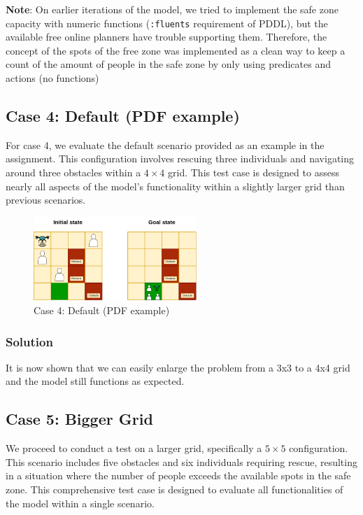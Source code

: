 \documentclass{article}
\begin{document}
\textbf{Note}: On earlier iterations of the model, we tried to implement the safe zone capacity with numeric functions (\texttt{:fluents} requirement of PDDL), but the available free online planners have trouble supporting them. Therefore, the concept of the spots of the free zone was implemented as a clean way to keep a count of the amount of people in the safe zone by only using predicates and actions (no functions)

\subsection{Case 4: Default (PDF example)}

For case 4, we evaluate the default scenario provided as an example in the assignment. This configuration involves rescuing three individuals and navigating around three obstacles within a \(4 \times 4\) grid. This test case is designed to assess nearly all aspects of the model's functionality within a slightly larger grid than previous scenarios.

\begin{figure}[ht]
    \centering
    \includegraphics[width=0.55\textwidth]{assets/problem-4-pdf-example.drawio.png}
    \caption{Case 4: Default (PDF example)}
    \label{fig:initial-state-default}
\end{figure}

\subsubsection{Solution}
It is now shown that we can easily enlarge the problem from a 3x3 to a 4x4 grid and the model still functions as expected.

\subsection{Case 5: Bigger Grid}

We proceed to conduct a test on a larger grid, specifically a \(5 \times 5\) configuration. This scenario includes five obstacles and six individuals requiring rescue, resulting in a situation where the number of people exceeds the available spots in the safe zone. This comprehensive test case is designed to evaluate all functionalities of the model within a single scenario.
\end{document}
